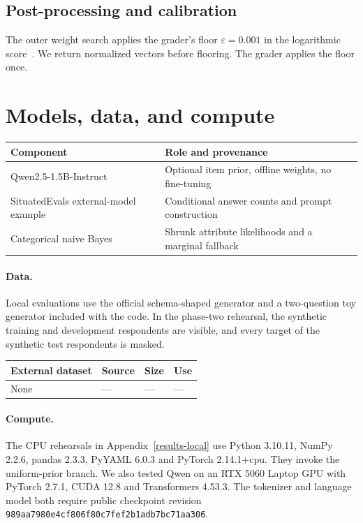 \documentclass{article}
\begin{document}
\subsection{Post-processing and calibration}
The outer weight search applies the grader's floor $\varepsilon=0.001$ in
the logarithmic score~\cite{scores}. We return normalized vectors before
flooring. The grader applies the floor once.

\section{Models, data, and compute}
\begin{center}\small
\begin{tabular}{@{}ll@{}}\toprule
Component & Role and provenance\\\midrule
Qwen2.5-1.5B-Instruct~\cite{qwen} & Optional item prior, offline weights, no fine-tuning\\
SituatedEvals external-model example~\cite{starter} & Conditional answer counts and prompt construction\\
Categorical naive Bayes & Shrunk attribute likelihoods and a marginal fallback\\
\bottomrule\end{tabular}
\end{center}
\paragraph{Data.} Local evaluations use the official
schema-shaped generator and a two-question toy generator included with the
code. In the phase-two rehearsal, the synthetic training and development
respondents are visible, and every target of the synthetic test respondents
is masked.\\[3pt]
\begin{tabular}{@{}llll@{}}\toprule External dataset & Source & Size & Use\\\midrule
None & --- & --- & ---\\\bottomrule\end{tabular}
\paragraph{Compute.} The CPU rehearsals in Appendix~\ref{results-local} use
Python 3.10.11, NumPy 2.2.6, pandas 2.3.3, PyYAML 6.0.3 and PyTorch
2.14.1+cpu. They invoke the uniform-prior branch. We also tested Qwen on an
RTX 5060 Laptop GPU with PyTorch 2.7.1, CUDA 12.8 and Transformers 4.53.3.
The tokenizer and language model both require public
checkpoint revision \texttt{989aa7980e4cf806f80c7fef2b1adb7bc71aa306}.
\end{document}
